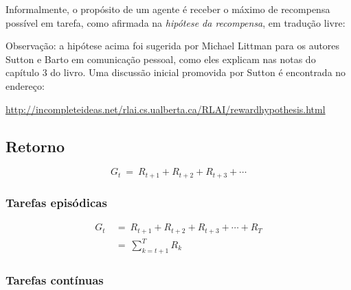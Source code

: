 \documentclass{article}
\begin{document}
            Informalmente, o propósito de um agente é receber o máximo de recompensa possível em tarefa, como afirmada na \emph{hipótese da recompensa}, em tradução livre:
            \begin{center}
            \noindent{}%
            \end{center}
            
            Observação: a hipótese acima foi sugerida por Michael Littman para os autores Sutton e Barto em comunicação pessoal, como eles explicam nas notas do capítulo 3 do livro. Uma discussão inicial promovida por Sutton é encontrada no endereço:
            
            \url{http://incompleteideas.net/rlai.cs.ualberta.ca/RLAI/rewardhypothesis.html}
        
        \subsection{Retorno}

            \begin{equation}
                G_t \ = \ R_{t+1} + R_{t+2} + R_{t+3} + \cdots
            \end{equation}

            \subsubsection{Tarefas episódicas}

                \begin{equation}
                \begin{split}
                    G_t & \ = \ R_{t+1} + R_{t+2} + R_{t+3} + \cdots + R_T \\
                    & \ = \ \sum_{k=t+1}^{T} R_k
                \end{split}
                \end{equation}

            \subsubsection{Tarefas contínuas}
        
\end{document}
